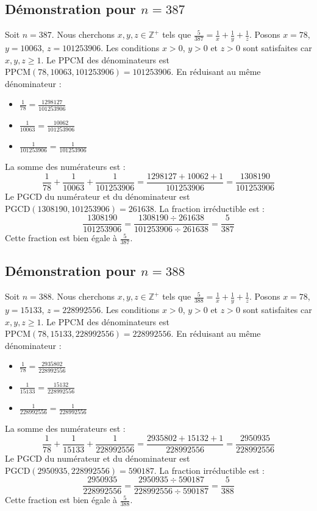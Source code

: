\documentclass[11pt,a4paper]{article}
\begin{document}
\subsection{Démonstration pour $n = 387$}
Soit $n = 387$. Nous cherchons $x, y, z \in \mathbb{Z}^{+}$ tels que $\frac{5}{387} = \frac{1}{x} + \frac{1}{y} + \frac{1}{z}$.
Posons $x = 78$, $y = 10063$, $z = 101253906$.
Les conditions $x > 0$, $y > 0$ et $z > 0$ sont satisfaites car $x, y, z \geq 1$.
Le PPCM des dénominateurs est $\text{PPCM}(78, 10063, 101253906) = 101253906$.
En réduisant au même dénominateur :
\begin{itemize}
    \item $\frac{1}{78} = \frac{1298127}{101253906}$
    \item $\frac{1}{10063} = \frac{10062}{101253906}$
    \item $\frac{1}{101253906} = \frac{1}{101253906}$
\end{itemize}
La somme des numérateurs est :
$$ \frac{1}{78} + \frac{1}{10063} + \frac{1}{101253906} = \frac{1298127 + 10062 + 1}{101253906} = \frac{1308190}{101253906} $$
Le PGCD du numérateur et du dénominateur est $\text{PGCD}(1308190, 101253906) = 261638$.
La fraction irréductible est :
$$ \frac{1308190}{101253906} = \frac{1308190 \div 261638}{101253906 \div 261638} = \frac{5}{387} $$
Cette fraction est bien égale à $\frac{5}{387}$.

\subsection{Démonstration pour $n = 388$}
Soit $n = 388$. Nous cherchons $x, y, z \in \mathbb{Z}^{+}$ tels que $\frac{5}{388} = \frac{1}{x} + \frac{1}{y} + \frac{1}{z}$.
Posons $x = 78$, $y = 15133$, $z = 228992556$.
Les conditions $x > 0$, $y > 0$ et $z > 0$ sont satisfaites car $x, y, z \geq 1$.
Le PPCM des dénominateurs est $\text{PPCM}(78, 15133, 228992556) = 228992556$.
En réduisant au même dénominateur :
\begin{itemize}
    \item $\frac{1}{78} = \frac{2935802}{228992556}$
    \item $\frac{1}{15133} = \frac{15132}{228992556}$
    \item $\frac{1}{228992556} = \frac{1}{228992556}$
\end{itemize}
La somme des numérateurs est :
$$ \frac{1}{78} + \frac{1}{15133} + \frac{1}{228992556} = \frac{2935802 + 15132 + 1}{228992556} = \frac{2950935}{228992556} $$
Le PGCD du numérateur et du dénominateur est $\text{PGCD}(2950935, 228992556) = 590187$.
La fraction irréductible est :
$$ \frac{2950935}{228992556} = \frac{2950935 \div 590187}{228992556 \div 590187} = \frac{5}{388} $$
Cette fraction est bien égale à $\frac{5}{388}$.
\end{document}
